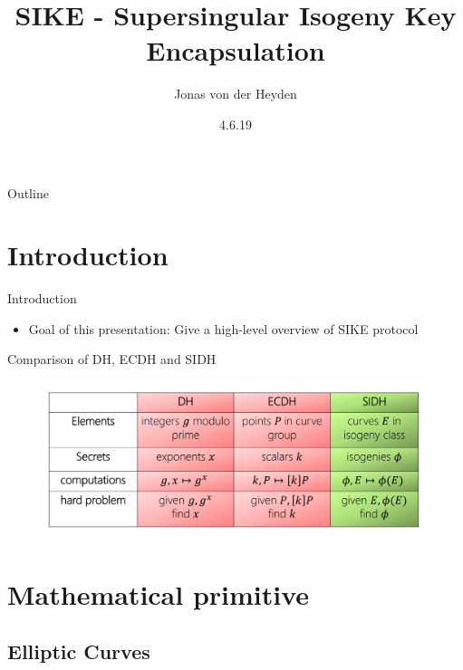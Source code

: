 \documentclass{beamer}
\title[SIKE]{SIKE - Supersingular Isogeny Key Encapsulation}
\author{Jonas von der Heyden}
\institute{FU Berlin}
\date{4.6.19}
\begin{document}
\newcommand{\source}[1]{\caption*{Source: {#1}} } %
\begin{frame}
  \titlepage
\end{frame}

\begin{frame}{Outline}
  \tableofcontents
\end{frame}

\section{Introduction}

\begin{frame}{Introduction}

	\begin{itemize}
  		\item Goal of this presentation: Give a high-level overview of SIKE protocol
	\end{itemize}

\end{frame}
\begin{frame}{Comparison of DH, ECDH and SIDH}
\begin{figure} %
	\centering
	\includegraphics[width=1\linewidth]{dh_ec_iso}
	\label{fig:dh_ec_iso}
\end{figure}
\end{frame}



\section{Mathematical primitive}

\subsection{Elliptic Curves}
\end{document}
